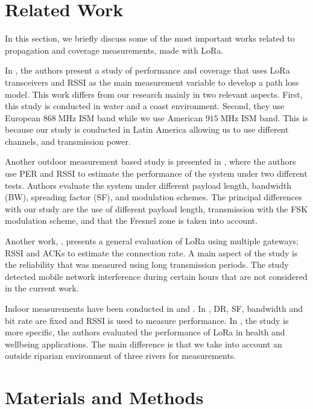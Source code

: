 \section{Related Work}

In this section, we briefly discuss some of the most important works related to propagation and coverage measurements, made with LoRa.

In \cite{Mikhaylov2016}, the authors present a study of performance and coverage that uses LoRa transceivers and RSSI as the main measurement variable to develop a path loss model. This work differs from our research mainly in two relevant aspects. First, this study is conducted in water and a coast environment. Second, they use European $868\;$MHz ISM band while we use American $915\;$MHz ISM band. This is because our study is conducted in Latin America allowing us to use different channels, and transmission power. 

Another outdoor measurement based study is presented in \cite{Aref2014}, where the authors use PER and RSSI to estimate the performance of the system under two different tests. Authors evaluate the system under different payload length, bandwidth (BW), spreading factor (SF), and modulation schemes. The principal differences with our study are the use of different payload length, transmission with the FSK modulation scheme, and that the Fresnel zone is taken into account.

Another work, \cite{Wixted2017}, presents a general evaluation of LoRa using multiple gateways; RSSI and ACKs to estimate the connection rate. A main aspect of the study is the reliability that was measured using long transmission periods. The study detected mobile network interference during certain hours that are not considered in the current work.

Indoor measurements have been conducted in \cite{Gregora2016} and \cite{Petajajarvi2016}. In \cite{Gregora2016}, DR, SF, bandwidth and bit rate are fixed and RSSI is used to measure performance. In \cite{Petajajarvi2016}, the study is more specific, the authors evaluated the performance of LoRa in health and wellbeing applications. The main difference is that we take into account an outside riparian environment of three rivers for measurements.

\section{Materials and Methods}

